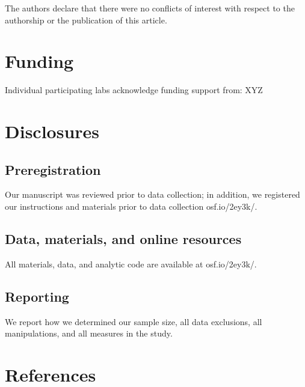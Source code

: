 \documentclass[,man,floatsintext]{apa6}
\begin{document}
The authors declare that there were no conflicts of interest with respect to the authorship or the publication of this article.

\hypertarget{funding}{%
\section{Funding}\label{funding}}

Individual participating labs acknowledge funding support from: XYZ

\hypertarget{disclosures}{%
\section{Disclosures}\label{disclosures}}

\hypertarget{preregistration}{%
\subsection{Preregistration}\label{preregistration}}

Our manuscript was reviewed prior to data collection; in addition, we registered our instructions and materials prior to data collection osf.io/2ey3k/.

\hypertarget{data-materials-and-online-resources}{%
\subsection{Data, materials, and online resources}\label{data-materials-and-online-resources}}

All materials, data, and analytic code are available at osf.io/2ey3k/.

\hypertarget{reporting}{%
\subsection{Reporting}\label{reporting}}

We report how we determined our sample size, all data exclusions, all manipulations, and all measures in the study.

\newpage

\hypertarget{references}{%
\section{References}\label{references}}

\begingroup
\setlength{\parindent}{-0.5in}
\setlength{\leftskip}{0.5in}
\end{document}
